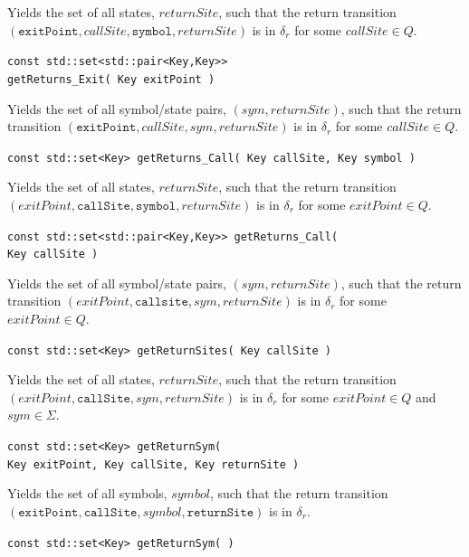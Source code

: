 \documentclass{llncs}
\begin{document}
\begin{description}
    Yields the set of all states, $returnSite$, such that the return
    transition $(\texttt{exitPoint},callSite,\texttt{symbol},returnSite)$ is
    in $\delta_r$ for some $callSite \in Q$.

  \item\texttt{const std::set<std::pair<Key,Key>> \\getReturns\_Exit( Key exitPoint )} \nopagebreak

    Yields the set of all symbol/state pairs, $(sym,returnSite)$, such that
    the return transition $(\texttt{exitPoint},callSite,sym,returnSite)$ is
    in $\delta_r$ for some $callSite \in Q$.

  \item\texttt{const std::set<Key> getReturns\_Call( Key callSite, Key symbol )} \nopagebreak

    Yields the set of all states, $returnSite$, such that the return
    transition $(exitPoint,\texttt{callSite},\texttt{symbol},returnSite)$ is
    in $\delta_r$ for some $exitPoint \in Q$.

  \item\texttt{const std::set<std::pair<Key,Key>> getReturns\_Call( \\ \hspace*{3.25cm} Key callSite )} \nopagebreak

    Yields the set of all symbol/state pairs, $(sym,returnSite)$, such that
    the return transition $(exitPoint,\texttt{callsite},sym,returnSite)$ is
    in $\delta_r$ for some $exitPoint \in Q$.

  \item\texttt{const std::set<Key> getReturnSites( Key callSite )} \nopagebreak

    Yields the set of all states, $returnSite$, such that the return
    transition $(exitPoint,\texttt{callSite},sym,returnSite)$ is in
    $\delta_r$ for some $exitPoint \in Q$ and $sym \in \Sigma$.

  \item\texttt{const std::set<Key> getReturnSym( \\ \hspace*{3.25cm}Key exitPoint, Key callSite, Key returnSite )} \nopagebreak

    Yields the set of all symbols, $symbol$, such that the return transition
    $(\texttt{exitPoint},\texttt{callSite},symbol,\texttt{returnSite})$ is in
    $\delta_r$.

  \item\texttt{const std::set<Key> getReturnSym( )} \nopagebreak


\end{description}
\end{document}
